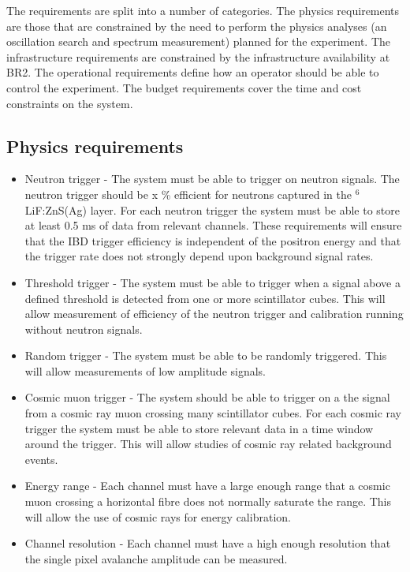 \documentclass[a4paper]{article}
\begin{document}
The requirements are split into a number of categories.
The physics requirements are those that are constrained by the need to perform the physics analyses (an oscillation search and spectrum measurement) planned for the experiment.
The infrastructure requirements are constrained by the infrastructure availability at BR2.
The operational requirements define how an operator should be able to control the experiment.
The budget requirements cover the time and cost constraints on the system.

\subsection{Physics requirements}

\begin{itemize}
\item Neutron trigger - The system must be able to trigger on neutron signals. 
    The neutron trigger should be x \% efficient for neutrons captured in the $^6$LiF:ZnS(Ag) layer. 
    For each neutron trigger the system must be able to store at least 0.5 ms of data from relevant channels. 
    These requirements will ensure that the IBD trigger efficiency is independent of the positron energy and that the trigger rate does not strongly depend upon background signal rates.
\item Threshold trigger - The system must be able to trigger when a signal above a defined threshold is detected from one or more scintillator cubes. 
    This will allow measurement of efficiency of the neutron trigger and calibration running without neutron signals.
\item Random trigger -  The system must be able to be randomly triggered. 
    This will allow measurements of low amplitude signals.
\item Cosmic muon trigger - The system should be able to trigger on a the signal from a cosmic ray muon crossing many scintillator cubes. 
    For each cosmic ray trigger the system must be able to store relevant data in a time window around the trigger. 
    This will allow studies of cosmic ray related background events.
\item Energy range - Each channel must have a large enough range that a cosmic muon crossing a horizontal fibre does not normally saturate the range. 
    This will allow the use of cosmic rays for energy calibration. 
\item Channel resolution - Each channel must have a high enough resolution that the single pixel avalanche amplitude can be measured. 

\end{itemize}
\end{document}
